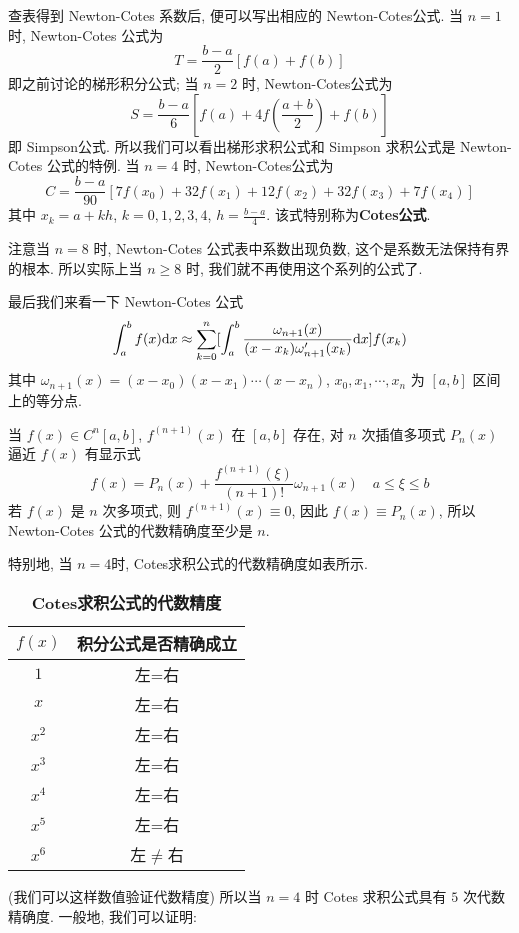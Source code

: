 \documentclass[a4paper]{ctexart}
\begin{document}
{查表得到 Newton-Cotes 系数后, 便可以写出相应的 Newton-Cotes公式. 当 $n = 1$ 时, Newton-Cotes 公式为
\begin{equation}
T=\frac{b-a}{2}[f(a)+f(b)] 
\end{equation}
即之前讨论的梯形积分公式; 当 $n=2$ 时, Newton-Cotes公式为
\begin{equation}
S=\frac{b-a}{6}[f(a)+4f(\frac{a+b}{2})+f(b)]
\end{equation}
即 Simpson公式. 所以我们可以看出梯形求积公式和 Simpson 求积公式是 Newton-Cotes 公式的特例.
当 $n=4$ 时, Newton-Cotes公式为
\begin{equation}
C=\frac{b-a}{90}[7f(x_0)+32f(x_1)+12f(x_2)+32f(x_3)+7f(x_4)]
\end{equation}
其中 $x_k=a+kh$, $k = 0,1,2,3,4$, $h=\frac{b-a}{4}$. 该式特别称为{\bf Cotes公式}.

注意当 $n = 8$ 时, Newton-Cotes 公式表中系数出现负数, 这个是系数无法保持有界的根本. 所以实际上当 $n \geq 8$ 时, 
我们就不再使用这个系列的公式了. 

最后我们来看一下 Newton-Cotes 公式
$$
\int^b_af(x){\rm d}x\approx\sum^n_{k=0}[\int^b_a\frac{\omega_{n+1}(x)}{(x-x_k)\omega'_{n+1}(x_k)}{\rm d}x]
f(x_k)
$$
其中 $\omega_{n+1}(x)=(x-x_0)(x-x_1)\cdots(x-x_n)$, $x_0, x_1, \cdots, x_n$ 为 $[a, b]$ 区间上的等分点.

当 $f(x)\in C^n[a,b]$, $f^{(n+1)}(x)$ 在 $[a, b]$ 存在, 对 $n$ 次插值多项式 $P_n(x)$ 逼近 $f(x)$ 有显示式
\begin{equation}
f(x) = P_n(x)+\frac{f^{(n+1)}(\xi)}{(n+1)!}\omega_{n+1}(x)\quad
a\leq\xi\leq b 
\end{equation}
若 $f(x)$ 是 $n$ 次多项式, 则 $f^{(n+1)}(x)\equiv 0$, 因此 $f(x)\equiv P_n(x)$, 
所以 Newton-Cotes 公式的代数精确度至少是 $n$.

特别地, 当 $n=4$时, Cotes求积公式的代数精确度如表所示.

\begin{table}[h]
\caption{\bf Cotes求积公式的代数精度}
\begin{center}
 \begin{tabular}{|c|c|}\hline
 $f(x)$  &   积分公式是否精确成立 \\\hline
$1$  &  左=右 \\\hline $x$  &  左=右 \\\hline $x^2$  &  左=右
\\\hline $x^3$  &  左=右 \\\hline $x^4$  &  左=右 \\\hline $x^5$  &
左=右 \\\hline $x^6$  &  左$\neq$右 \\\hline
 \end{tabular}
\end{center}
\end{table}
(我们可以这样数值验证代数精度)
所以当 $n=4$ 时 Cotes 求积公式具有 $5$ 次代数精确度. 一般地, 我们可以证明:

}
\end{document}
